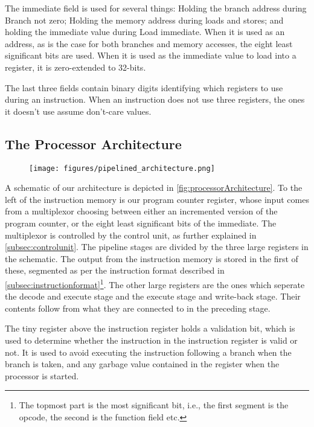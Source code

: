 \documentclass[11pt]{article}
\makeatletter
\newcommand{\etc}{etc.\@\xspace} \newcommand{\ie}{i.e.,\xspace}
\makeatother
\begin{document}
The immediate field is used for several things: Holding the branch
address during Branch not zero; Holding the memory address during
loads and stores; and holding the immediate value during Load
immediate. When it is used as an address, as is the case for both
branches and memory accesses, the eight least significant bits are
used. When it is used as the immediate value to load into a register,
it is zero-extended to 32-bits.

The last three fields contain binary digits identifying which
registers to use during an instruction. When an instruction does not
use three registers, the ones it doesn't use assume don't-care values. 

\subsection{The Processor Architecture}
\label{subsec:processor} 

\begin{figure}[ht]
  \centering
  \texttt{[image: figures/pipelined\_architecture.png]}
  \caption{\label{fig:processorArchitecture} }
\end{figure}

A schematic of our architecture is depicted in
\autoref{fig:processorArchitecture}. To the left of the instruction
memory is our program counter register, whose input comes from a
multiplexor choosing between either an incremented version of the
program counter, or the eight least significant bits of the
immediate. The multiplexor is controlled by the control unit, as
further explained in \autoref{subsec:controlunit}. The pipeline stages
are divided by the three large registers in the schematic. The output
from the instruction memory is stored in the first of these, segmented
as per the instruction format described in
\autoref{subsec:instructionformat}\footnote{The topmost part is the
  most significant bit, {\ie} the first segment is the opcode, the
  second is the function field {\etc}}. The other large registers are
the ones which seperate the decode and execute stage and the execute
stage and write-back stage. Their contents follow from what they are
connected to in the preceding stage. 

The tiny register above the instruction register holds a validation
bit, which is used to determine whether the instruction in the
instruction register is valid or not. It is used to avoid executing
the instruction following a branch when the branch is taken, and any
garbage value contained in the register when the processor is started.
\end{document}
